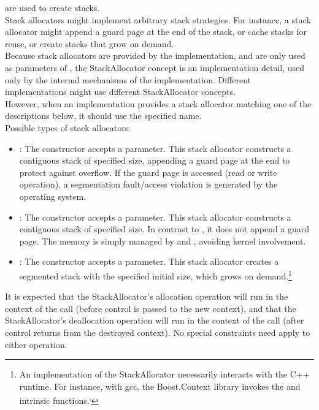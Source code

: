 \label{subsec:stackalloc}
are used to create stacks.\\
Stack allocators might implement arbitrary stack strategies. For instance, a
stack allocator might append a guard page at the end of the stack, or cache
stacks for reuse, or create stacks that grow on demand.\\
Because stack allocators are provided by the implementation, and are only used
as parameters of \callcc, the StackAllocator concept is an implementation detail,
used only by the internal mechanisms of the \cc implementation. Different
implementations might use different StackAllocator concepts.\\
However, when an implementation provides a stack allocator matching one of
the descriptions below, it should use the specified name.\\
Possible types of stack allocators:
\begin{itemize}
    \item {}: The constructor accepts a 
        parameter. This stack allocator constructs a contiguous stack of
        specified size, appending a guard page at the end to protect against
        overflow. If the guard page is accessed (read or write operation), a
        segmentation fault/access violation is generated by the operating
        system.
    \item {}: The constructor accepts a  parameter.
        This stack allocator constructs a contiguous stack of specified size.
        In contrast to , it does not append a guard
        page. The memory is simply managed by 
        and , avoiding kernel involvement.
    \item {}: The constructor accepts a  parameter.
        This stack allocator creates a segmented stack with the specified
        initial size, which grows on demand.\footnote{An implementation of
        the  StackAllocator necessarily interacts with the C++
        runtime. For instance, with gcc, the Boost.Context\cite{bcontext} library
        invokes the 
        and  intrinsic
        functions.\cite{splitalloc}\textsuperscript{,}\cite{bctxseg}}
\end{itemize}

It is expected that the StackAllocator's allocation operation will run in the
context of the \callcc call (before control is passed to the new context), and
that the StackAllocator's deallocation operation will run in the context of
the  call (after control returns from the destroyed
context). No special constraints need apply to either operation.
